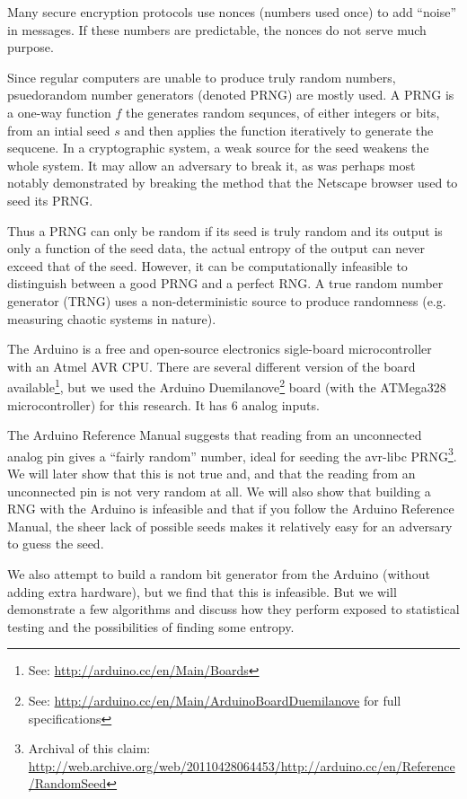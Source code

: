 \documentclass[a4paper]{article}           %
\begin{document}
Many secure encryption protocols use nonces (numbers used once) to add ``noise'' in messages\cite{anthes2011}. If these numbers are predictable, the nonces do not serve much purpose. 

Since regular computers are unable to produce truly random numbers, psuedorandom number generators (denoted PRNG) are mostly used. A PRNG is a one-way function $f$ the generates random sequnces, of either integers or bits, from an intial seed $s$ and then applies the function iteratively to generate the sequcene\cite{menezes1996}. In a cryptographic system, a weak source for the seed weakens the whole system. It may allow an adversary to break it, as was perhaps most notably demonstrated by breaking the method that the Netscape browser used to seed its PRNG\cite{netscape}. 

Thus a PRNG can only be random if its seed is truly random and its output is only a function of the seed data, the actual entropy of the output can never exceed that of the seed. However, it can be computationally infeasible to distinguish between a good PRNG and a perfect RNG. A true random number generator (TRNG) uses a non-deterministic source to produce randomness (e.g. measuring chaotic systems in nature). 

The Arduino is a free and open-source electronics sigle-board microcontroller with an Atmel AVR CPU. There are several different version of the board available\footnote{See: \url{http://arduino.cc/en/Main/Boards}}, but we used the Arduino Duemilanove\footnote{See: \url{http://arduino.cc/en/Main/ArduinoBoardDuemilanove} for full specifications} board (with the ATMega328\cite{atmegads} microcontroller) for this research. It has 6 analog inputs. 

The Arduino Reference Manual suggests that reading from an unconnected analog pin gives a ``fairly random'' number\cite{ardref}, ideal for seeding the avr-libc PRNG\footnote{Archival of this claim: \url{http://web.archive.org/web/20110428064453/http://arduino.cc/en/Reference/RandomSeed}}. We will later show that this is not true and, and that the reading from an unconnected pin is not very random at all. We will also show that building a RNG with the Arduino is infeasible and that if you follow the Arduino Reference Manual, the sheer lack of possible seeds makes it relatively easy for an adversary to guess the seed.

We also attempt to build a random bit generator from the Arduino (without adding extra hardware), but we find that this is infeasible. But we will demonstrate a few algorithms and discuss how they perform exposed to statistical testing and the possibilities of finding some entropy. 
\end{document}
